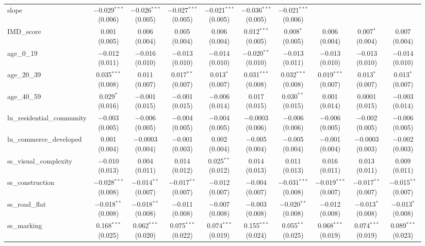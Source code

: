 \begin{table}[!htbp]
\begin{tabular}{@{\extracolsep{1pt}}lccccccccc}
  slope & $-$0.029$^{***}$ (0.006) & $-$0.026$^{***}$ (0.005) & $-$0.027$^{***}$ (0.005) & $-$0.021$^{***}$ (0.005) & $-$0.036$^{***}$ (0.005) & $-$0.021$^{***}$ (0.006) &  &  &  \\ 
  IMD\_score & 0.001 (0.005) & 0.006 (0.004) & 0.005 (0.004) & 0.006 (0.004) & 0.012$^{***}$ (0.005) & 0.008$^{*}$ (0.005) & 0.006 (0.004) & 0.007$^{*}$ (0.004) & 0.007 (0.004) \\ 
  age\_0\_19 & $-$0.012 (0.011) & $-$0.016 (0.010) & $-$0.013 (0.010) & $-$0.014 (0.010) & $-$0.020$^{**}$ (0.010) & $-$0.013 (0.011) & $-$0.013 (0.010) & $-$0.013 (0.010) & $-$0.014 (0.010) \\ 
  age\_20\_39 & 0.035$^{***}$ (0.008) & 0.011 (0.007) & 0.017$^{**}$ (0.007) & 0.013$^{*}$ (0.007) & 0.031$^{***}$ (0.008) & 0.032$^{***}$ (0.008) & 0.019$^{***}$ (0.007) & 0.013$^{*}$ (0.007) & 0.013$^{*}$ (0.007) \\ 
  age\_40\_59 & 0.029$^{*}$ (0.016) & $-$0.001 (0.015) & $-$0.001 (0.015) & $-$0.006 (0.014) & 0.017 (0.015) & 0.030$^{**}$ (0.015) & 0.001 (0.014) & 0.0001 (0.015) & $-$0.003 (0.014) \\ 
  lu\_residential\_community & $-$0.003 (0.005) & $-$0.006 (0.005) & $-$0.004 (0.005) & $-$0.004 (0.005) & $-$0.0003 (0.006) & $-$0.006 (0.006) & $-$0.006 (0.005) & $-$0.002 (0.005) & $-$0.006 (0.005) \\ 
  lu\_commerce\_developed & 0.001 (0.004) & $-$0.0003 (0.004) & $-$0.001 (0.003) & 0.002 (0.004) & $-$0.005 (0.004) & $-$0.005 (0.004) & $-$0.001 (0.004) & $-$0.0003 (0.003) & $-$0.002 (0.003) \\ 
  ss\_visual\_complexity & $-$0.010 (0.013) & 0.004 (0.011) & 0.014 (0.012) & 0.025$^{**}$ (0.012) & 0.014 (0.013) & 0.011 (0.013) & 0.016 (0.011) & 0.013 (0.011) & 0.009 (0.011) \\ 
  ss\_construction & $-$0.028$^{***}$ (0.008) & $-$0.014$^{**}$ (0.007) & $-$0.017$^{**}$ (0.007) & $-$0.012 (0.007) & $-$0.004 (0.007) & $-$0.031$^{***}$ (0.008) & $-$0.019$^{***}$ (0.007) & $-$0.017$^{**}$ (0.007) & $-$0.015$^{**}$ (0.007) \\ 
  ss\_road\_flat & $-$0.018$^{**}$ (0.008) & $-$0.018$^{**}$ (0.008) & $-$0.011 (0.008) & $-$0.007 (0.008) & $-$0.003 (0.008) & $-$0.020$^{**}$ (0.008) & $-$0.012 (0.008) & $-$0.013$^{*}$ (0.008) & $-$0.013$^{*}$ (0.008) \\ 
  ss\_marking & 0.168$^{***}$ (0.025) & 0.062$^{***}$ (0.020) & 0.075$^{***}$ (0.022) & 0.074$^{***}$ (0.019) & 0.155$^{***}$ (0.024) & 0.055$^{**}$ (0.025) & 0.068$^{***}$ (0.019) & 0.074$^{***}$ (0.019) & 0.089$^{***}$ (0.023) \\ 

\end{tabular}
\end{table}
